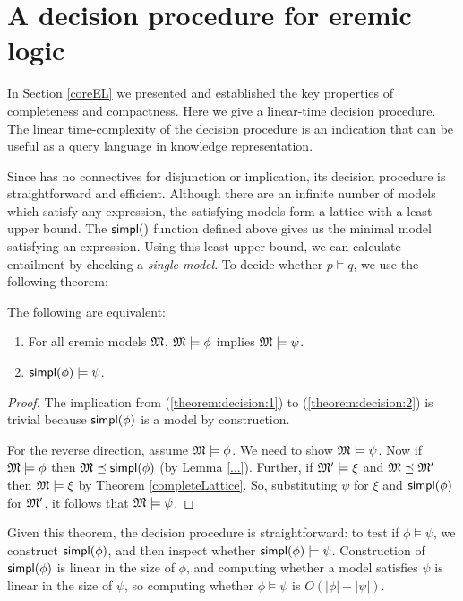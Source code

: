 \section{A decision procedure for eremic logic}\label{decisionprocedure}

In Section \ref{coreEL} we presented \ELABR{} and established the key
properties of completeness and compactness.  Here we give a
linear-time decision procedure.  The linear time-complexity of the
decision procedure is an indication that \ELABR{} can be useful as a
query language in knowledge representation. 

\NI Since \ELABR{} has no connectives for disjunction or implication, its
decision procedure is straightforward and efficient.  Although there
are an infinite number of models which satisfy any expression, the
satisfying models form a lattice with a least upper bound.  The $\SIMPL$
function defined above gives us the minimal model satisfying an
expression.  Using this least upper bound, we can calculate entailment
by checking a \emph{single model}.  To decide whether $p \models q$,
we use the following theorem:

\begin{theorem}\label{theorem:decision}
  The following are equivalent:
  \begin{enumerate}
    \item\label{theorem:decision:1} For all eremic models $\frak{M}$,
      $\frak{M} \models \phi$ implies $\frak{M} \models \psi$.
    \item\label{theorem:decision:2} $\mathsf{simpl}(\phi) \models \psi$.
  \end{enumerate}
\end{theorem}

\begin{proof}
The implication from  (\ref{theorem:decision:1}) to
(\ref{theorem:decision:2}) is trivial because $\mathsf{simpl}(\phi)$ is a model by construction.

For the reverse direction, assume $\frak{M} \models \phi$. We need to show
$\frak{M} \models \psi$.  Now if $\frak{M} \models \phi$ then $\frak{M} \preceq
\mathsf{simpl}(\phi)$ (by Lemma \ref{...}).  Further, if $\frak{M}' \models \xi $
and $\frak{M} \preceq \frak{M}'$ then $\frak{M} \models \xi $ by Theorem
\ref{completeLattice}. So, substituting $\psi$ for $\xi $ and
$\mathsf{simpl}(\phi)$ for $\frak{M}'$, it follows that $\frak{M} \models \psi$.
\end{proof}

\NI Given this theorem, the decision procedure is straightforward: to
test if $\phi \models \psi$, we construct $\mathsf{simpl}(\phi)$, and then inspect whether
$\mathsf{simpl}(\phi) \models \psi$.  Construction of $\mathsf{simpl}(\phi)$ is linear in the size of
$\phi$, and computing whether a model satisfies $\psi$ is linear in the size
of $\psi$, so computing whether $\phi \models \psi$ is $O(|\phi|+|\psi|)$.


